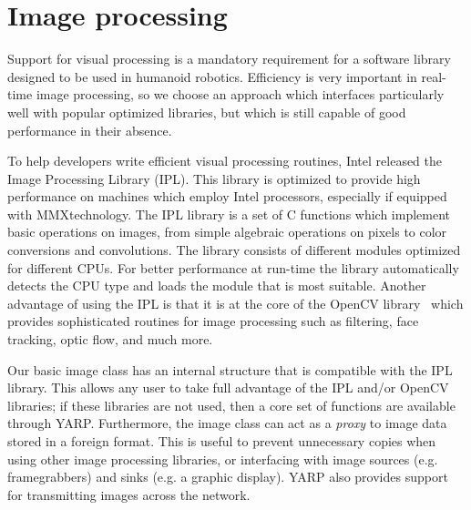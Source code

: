 \section{Image processing}

Support for visual processing is a mandatory requirement for a
software library designed to be used in humanoid robotics. 
%
%
Efficiency is very important in real-time image processing, so we choose
an approach which interfaces particularly well with popular
optimized libraries, but which is still capable of good
performance in their absence.

To help developers write efficient visual processing routines, Intel
released the Image Processing Library (IPL). This library is optimized
to provide high performance on machines which employ Intel processors,
especially if equipped with MMX\texttrademark technology. The IPL
library is a set of C functions which implement basic operations on
images, from simple algebraic operations on pixels to color
conversions and convolutions. The library consists of different
modules optimized for different CPUs. For better performance at
run-time the library automatically detects the CPU type and loads the
module that is most suitable. Another advantage of using the IPL is
that it is at the core of the OpenCV library~\cite{bradski04open}
which provides 
sophisticated routines for image processing such as filtering, face
tracking, optic flow, and much more.

Our basic image class has an internal structure that is
compatible with the IPL library.  This allows any user to take full
advantage of the IPL and/or OpenCV libraries; if these libraries
are not used, then a core set of functions are available through
YARP.  Furthermore, the image class can act as a {\em proxy} to image
data stored in a foreign format.  This is useful to prevent unnecessary
copies when using other image processing libraries, or interfacing
with image sources (e.g. framegrabbers) and sinks (e.g. a graphic
display).
%
%
%
%
YARP also provides support for transmitting images across the network.



